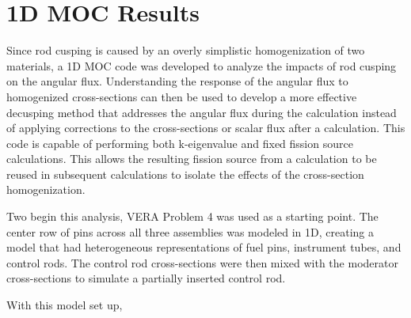 \begin{table}
\centering
\caption{VERA Problem 5 Decusping Results}\label{t:p5decusp}
\end{table}


\section{1D MOC Results}

Since rod cusping is caused by an overly simplistic homogenization of two materials, a 1D MOC code was developed to analyze the impacts of rod cusping on the angular flux.  Understanding the response of the angular flux to homogenized cross-sections can then be used to develop a more effective decusping method that addresses the angular flux during the calculation instead of applying corrections to the cross-sections or scalar flux after a calculation.  This code is capable of performing both k-eigenvalue and fixed fission source calculations.  This allows the resulting fission source from a calculation to be reused in subsequent calculations to isolate the effects of the cross-section homogenization.

Two begin this analysis, VERA Problem 4 was used as a starting point.  The center row of pins across all three assemblies was modeled in 1D, creating a model that had heterogeneous representations of fuel pins, instrument tubes, and control rods.  The control rod cross-sections were then mixed with the moderator cross-sections to simulate a partially inserted control rod.  

With this model set up, 